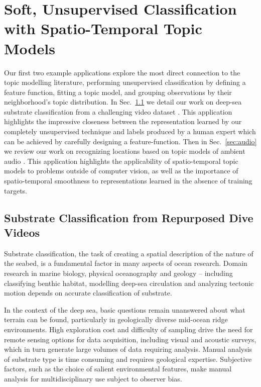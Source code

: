 
\chapter{Soft, Unsupervised Classification with Spatio-Temporal Topic Models} \label{ch:topic-models-examples}
Our first two example applications explore the most direct connection to the topic modelling literature, performing unsupervised classification by defining a feature function, fitting a topic model, and grouping observations by their neighborhood's topic distribution. In Sec.~\ref{sec:substrate} we detail our work on deep-sea substrate classification from a challenging video dataset \citep{Kalmbach2016}. This application highlights the impressive closeness between the representation learned by our completely unsupervised technique and labels produced by a human expert which can be achieved by carefully designing a feature-function. Then in Sec.~\ref{sec:audio} we review our work on recognizing locations based on topic models of ambient audio \citep{Kalmbach2013}. This application highlights the applicability of spatio-temporal topic models to problems outside of computer vision, as well as the importance of spatio-temporal smoothness to representations learned in the absence of training targets.

\section{Substrate Classification from Repurposed Dive Videos} \label{sec:substrate}

Substrate classification, the task of creating a spatial description of the nature of the seabed, is a fundamental factor in many aspects of ocean research.
Domain research in marine biology, physical oceanography and geology -- including classifying benthic habitat, modelling deep-sea circulation and analyzing tectonic motion depends on accurate classification of substrate.

In the context of the deep sea, basic questions remain unanswered about what terrain can be found, particularly in geologically diverse mid-ocean ridge environments. High exploration cost and difficulty of sampling drive the need for remote sensing options for data acquisition, including visual and acoustic surveys, which in turn generate large volumes of data requiring analysis.
Manual analysis of substrate type is time consuming and requires geological expertise. Subjective factors, such as the choice of salient environmental features, make manual analysis for multidisciplinary use subject to observer bias.

